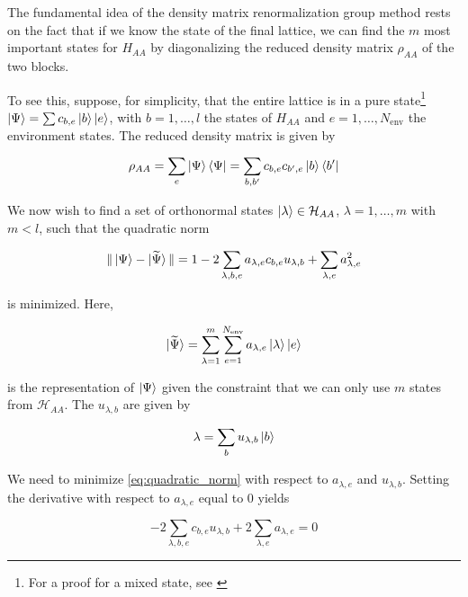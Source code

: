 The fundamental idea of the density matrix renormalization group method
rests on the fact that if we know the state of the final lattice, we can find the $m$
most important states for $H_{AA}$ by diagonalizing the reduced density
matrix $\rho_{AA}$ of the two blocks.

To see this, suppose, for simplicity, that the entire lattice is in a pure
state\footnote{For a proof for a mixed state, see \cite{noack1999workshop}} $\ket{\Psi} = \sum c_{b, e} \ket{b} \ket{e}$, with $b = 1, \ldots, l$ the
states of $H_{AA}$ and $e = 1, \ldots, N_{\text{env}}$ the environment states. The
reduced density matrix is given by

\begin{equation}
  \rho_{AA} = \sum_{e} \ket{\Psi} \bra{\Psi} = \sum_{b, b'} c_{b, e} c_{b', e} \ket{b} \bra{b'}
\end{equation}

We now wish to find a set of orthonormal states $\ket{\lambda} \in \mathcal{H}_{AA}$,
$\lambda = 1, \ldots, m$ with $m < l$, such that the quadratic norm

\begin{equation}\label{eq:quadratic_norm}
  \Vert \ket{\Psi} - \ket{\widetilde{\Psi}} \Vert = 1 - 2 \sum_{\lambda, b, e} a_{\lambda, e} c_{b, e} u_{\lambda, b} + \sum_{\lambda, e} a_{\lambda, e}^2
\end{equation}

is minimized. Here,

\begin{equation}
  \ket{\widetilde{\Psi}} = \sum_{\lambda = 1}^{m} \sum_{e = 1}^{N_{\text{env}}} a_{\lambda, e} \ket{\lambda} \ket{e}
\end{equation}

is the representation of $\ket{\Psi}$ given the constraint that we can only use
$m$ states from $\mathcal{H}_{AA}$. The $u_{\lambda, b}$ are given by

\begin{equation}
  \lambda = \sum_{b} u_{\lambda, b} \ket{b}
\end{equation}

We need to minimize \eqref{eq:quadratic_norm} with respect to $a_{\lambda, e}$
and $u_{\lambda, b}$. Setting the derivative with respect to $a_{\lambda, e}$ equal to 0 yields

\begin{equation}
  -2 \sum_{\lambda, b, e} c_{b, e} u_{\lambda, b} + 2 \sum_{\lambda, e} a_{\lambda, e} = 0
\end{equation}

